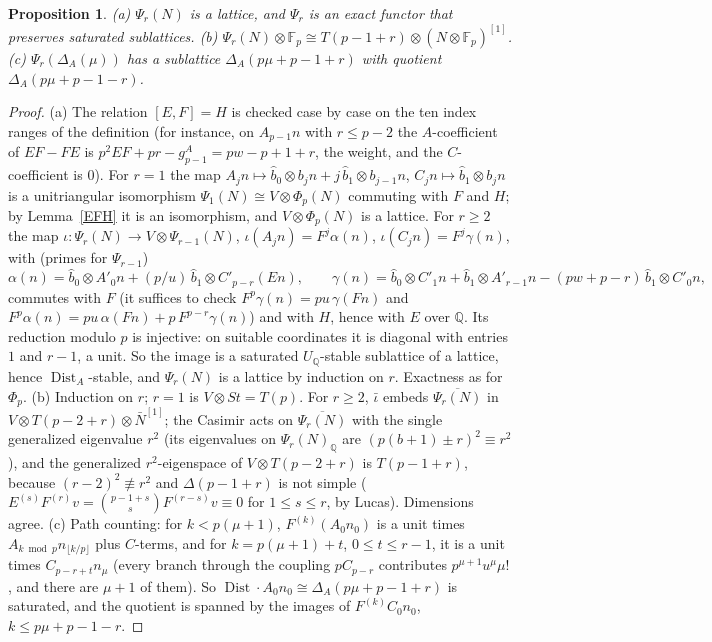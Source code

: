 \documentclass[10pt]{article}
\theoremstyle{ds}
\newtheorem{proposition}[lemma]{Proposition}
\theoremstyle{dsrem}
\newcommand{\Q}{\mathbb{Q}}
\newcommand{\F}{\mathbb{F}}
\newcommand{\Dist}{\operatorname{Dist}}
\begin{document}
\begin{proposition}\label{propPsi}
(a) $\Psi_r(N)$ is a lattice, and $\Psi_r$ is an exact functor that preserves saturated sublattices.
(b) $\Psi_r(N)\otimes\F_p\cong T(p-1+r)\otimes(N\otimes\F_p)^{[1]}$.
(c) $\Psi_r(\Delta_A(\mu))$ has a sublattice $\Delta_A(p\mu+p-1+r)$ with quotient $\Delta_A(p\mu+p-1-r)$.
\end{proposition}

\begin{proof}
(a) The relation $[E,F]=H$ is checked case by case on the ten index ranges of the definition (for instance, on $A_{p-1}n$ with $r\le p-2$ the $A$-coefficient of $EF-FE$ is $p^2EF+pr-g^A_{p-1}=pw-p+1+r$, the weight, and the $C$-coefficient is $0$). For $r=1$ the map $A_jn\mapsto\hat b_0\otimes b_jn+j\,\hat b_1\otimes b_{j-1}n$, $C_jn\mapsto\hat b_1\otimes b_jn$ is a unitriangular isomorphism $\Psi_1(N)\cong V\otimes\Phi_p(N)$ commuting with $F$ and $H$; by Lemma~\ref{EFH} it is an isomorphism, and $V\otimes\Phi_p(N)$ is a lattice. For $r\ge2$ the map $\iota\colon\Psi_r(N)\to V\otimes\Psi_{r-1}(N)$, $\iota(A_jn)=F^j\alpha(n)$, $\iota(C_jn)=F^j\gamma(n)$, with (primes for $\Psi_{r-1}$)
\[
\alpha(n)=\hat b_0\otimes A'_0n+(p/u)\,\hat b_1\otimes C'_{p-r}(En),\qquad \gamma(n)=\hat b_0\otimes C'_1n+\hat b_1\otimes A'_{r-1}n-(pw+p-r)\,\hat b_1\otimes C'_0n,
\]
commutes with $F$ (it suffices to check $F^p\gamma(n)=pu\,\gamma(Fn)$ and $F^p\alpha(n)=pu\,\alpha(Fn)+p\,F^{p-r}\gamma(n)$) and with $H$, hence with $E$ over $\Q$. Its reduction modulo $p$ is injective: on suitable coordinates it is diagonal with entries $1$ and $r-1$, a unit. So the image is a saturated $U_\Q$-stable sublattice of a lattice, hence $\Dist_A$-stable, and $\Psi_r(N)$ is a lattice by induction on $r$. Exactness as for $\Phi_p$.
(b) Induction on $r$; $r=1$ is $V\otimes St=T(p)$. For $r\ge2$, $\bar\iota$ embeds $\overline{\Psi_r(N)}$ in $V\otimes T(p-2+r)\otimes\bar N^{[1]}$; the Casimir acts on $\overline{\Psi_r(N)}$ with the single generalized eigenvalue $r^2$ (its eigenvalues on $\Psi_r(N)_\Q$ are $(p(b+1)\pm r)^2\equiv r^2$), and the generalized $r^2$-eigenspace of $V\otimes T(p-2+r)$ is $T(p-1+r)$, because $(r-2)^2\not\equiv r^2$ and $\Delta(p-1+r)$ is not simple ($E^{(s)}F^{(r)}v=\binom{p-1+s}{s}F^{(r-s)}v\equiv0$ for $1\le s\le r$, by Lucas). Dimensions agree.
(c) Path counting: for $k<p(\mu+1)$, $F^{(k)}(A_0n_0)$ is a unit times $A_{k\bmod p}n_{\lfloor k/p\rfloor}$ plus $C$-terms, and for $k=p(\mu+1)+t$, $0\le t\le r-1$, it is a unit times $C_{p-r+t}n_\mu$ (every branch through the coupling $pC_{p-r}$ contributes $p^{\mu+1}u^\mu\mu!$, and there are $\mu+1$ of them). So $\Dist\cdot A_0n_0\cong\Delta_A(p\mu+p-1+r)$ is saturated, and the quotient is spanned by the images of $F^{(k)}C_0n_0$, $k\le p\mu+p-1-r$.
\end{proof}
\end{document}
